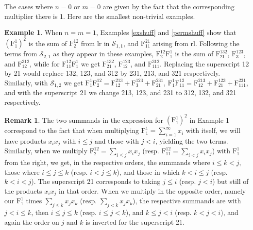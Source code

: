 \documentclass{article}
\theoremstyle{definition}
\newtheorem{rmk}[thm]{Remark}
\newtheorem{ex}[thm]{Example}
\begin{document}
The cases where $n=0$ or $m=0$ are given by the fact that the corresponding multiplier there is 1. Here are the smallest non-trivial examples.
\begin{ex}
When $n=m=1$, Examples \ref{exshuff} and \ref{permshuff} show that $(\mathrm{F}_{1}^{1})^{2}$ is the sum of $\mathrm{F}_{2}^{12}$ from lr in $\mathcal{S}_{1,1}$, and $\mathrm{F}_{11}^{21}$ arising from rl. Following the terms from $\mathcal{S}_{2,1}$ as they appear in these examples, $\mathrm{F}_{2}^{12}\mathrm{F}_{1}^{1}$ is the sum of $\mathrm{F}_{21}^{132}$, $\mathrm{F}_{3}^{123}$, and $\mathrm{F}_{12}^{312}$, while for $\mathrm{F}_{11}^{12}\mathrm{F}_{1}^{1}$ we get $\mathrm{F}_{21}^{132}$, $\mathrm{F}_{12}^{123}$, and $\mathrm{F}_{111}^{312}$. Replacing the superscript 12 by 21 would replace 132, 123, and 312 by 231, 213, and 321 respectively. Similarly, with $\mathcal{S}_{1,2}$ we get $\mathrm{F}_{1}^{1}\mathrm{F}_{2}^{12}=\mathrm{F}_{12}^{213}+\mathrm{F}_{3}^{123}+\mathrm{F}_{21}^{231}$, $\mathrm{F}_{1}^{1}\mathrm{F}_{11}^{12}=\mathrm{F}_{12}^{213}+\mathrm{F}_{21}^{123}+\mathrm{F}_{111}^{231}$, and with the superscript 21 we change 213, 123, and 231 to 312, 132, and 321 respectively. \label{exprod}
\end{ex}

\begin{rmk}
The two summands in the expression for $(\mathrm{F}_{1}^{1})^{2}$ in Example \ref{exprod} correspond to the fact that when multiplying $\mathrm{F}_{1}^{1}=\sum_{i=1}^{\infty}x_{i}$ with itself, we will have products $x_{i}x_{j}$ with $i \leq j$ and those with $j<i$, yielding the two terms. Similarly, when we multiply $\mathrm{F}_{2}^{12}=\sum_{i \leq j}x_{i}x_{j}$ (resp. $\mathrm{F}_{11}^{12}=\sum_{i<j}x_{i}x_{j}$) with $\mathrm{F}_{1}^{1}$ from the right, we get, in the respective orders, the summands where $i \leq k<j$, those where $i \leq j \leq k$ (resp. $i<j \leq k$), and those in which $k<i \leq j$ (resp. $k<i<j$). The superscript 21 corresponds to taking $j \leq i$ (resp. $j<i$) but still of the products $x_{i}x_{j}$ in that order. When we multiply in the opposite order, namely our $\mathrm{F}_{1}^{1}$ times $\sum_{j \leq k}x_{j}x_{k}$ (resp. $\sum_{j<k}x_{j}x_{k}$), the respective summands are with $j<i \leq k$, then $i \leq j \leq k$ (resp. $i \leq j<k$), and $k \leq j<i$ (resp. $k<j<i$), and again the order on $j$ and $k$ is inverted for the superscript 21. \label{expsumind}
\end{rmk}
\end{document}
